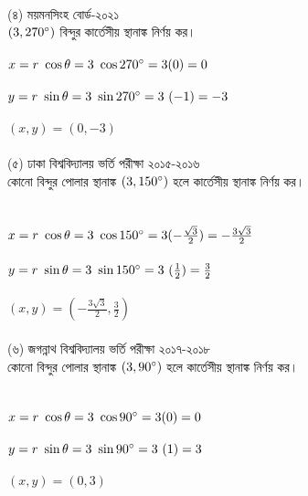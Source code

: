 \documentclass{article}
\begin{document}
	\\ 
	(৪) ময়মনসিংহ  বোর্ড-২০২১\\
	$(3,270\degree)$ বিন্দুর কার্তেসীয় স্থানাঙ্ক নির্ণয় কর।\\  
	\\
		$x=r\,\,\cos \theta= 3\,\,\cos 270\degree= 3 (0)=0$\\
	\\
	$y=r\,\,\sin \theta= 3\,\,\sin 270\degree= 3\,\,(-1)=-3$\\
	\\
	$(x,y)=(0,-3)$\\
	\\ 
	(৫) ঢাকা বিশ্ববিদ্যালয় ভর্তি পরীক্ষা ২০১৫-২০১৬\\   
	কোনো বিন্দুর পোলার স্থানাঙ্ক $(3,150\degree)$ হলে কার্তেসীয় স্থানাঙ্ক নির্ণয় কর। \\
	\\
		\\
	$x=r\,\,\cos \theta= 3\,\,\cos 150\degree= 3 (-\frac{\sqrt{3}}{2})=-\frac{3\sqrt{3}}{2}$\\
	\\
	$y=r\,\,\sin \theta= 3\,\,\sin 150\degree= 3\,\,(\frac{1}{2})=\frac{3}{2}$\\
	\\
	$(x,y)=(-\frac{3\sqrt{3}}{2},\frac{3}{2})$\\
	\\ 
	(৬) জগন্নাথ বিশ্ববিদ্যালয় ভর্তি পরীক্ষা ২০১৭-২০১৮\\ 
	কোনো বিন্দুর পোলার স্থানাঙ্ক $(3,90\degree)$ হলে কার্তেসীয় স্থানাঙ্ক নির্ণয় কর। \\
	\\
	\\
	$x=r\,\,\cos \theta= 3\,\,\cos 90\degree= 3 (0)=0$\\
	\\
	$y=r\,\,\sin \theta= 3\,\,\sin 90\degree= 3\,\,(1)=3$\\
	\\
	$(x,y)=(0,3)$\\
	
\end{document}

